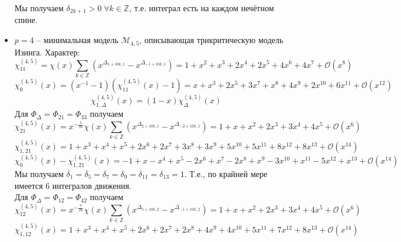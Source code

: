 \documentclass[12pt]{article}
\theoremstyle{definition}
\begin{document}
\begin{itemize}
\begin{equation}
    \end{equation}
    Мы получаем $\delta_{2k+1}>0\;\forall k\in\mathbb{Z}$, т.е. интеграл есть на каждом нечётном спине.
    \item $p=4$ -- минимальная модель $\mathcal{M}_{4,5}$, описывающая трикритическую модель Изинга. Характер:
    \begin{equation}
        \chi_{11}^{(4,5)}=\chi(x)\sum\limits_{k\in\mathbb{Z}}(x^{\Delta_{1+10k,1}}-x^{\Delta_{-1+10k,1}})=1+x^2+x^3+2x^4+2x^5+4x^6+4x^7+\mathcal{O}(x^8)
    \end{equation}
    \begin{equation}
        \chi^{(4,5)}_0(x)=(x^{-1}-1)(\chi^{(4,5)}_{11}(x)-1)=x+x^3+2x^5+3x^7+x^8+4x^9+2x^{10}+6x^{11}+\mathcal{O}(x^{12})
    \end{equation}
    \begin{equation}
        \chi^{(4,5)}_{1,\Delta}(x)=(1-x)\chi^{(4,5)}_\Delta(x)
    \end{equation}
    Для $\Phi_\Delta=\Phi_{21}=\Phi_{33}$ получаем
    \begin{equation}
        \chi^{(4,5)}_{21}(x)=x^{-\frac{1}{10}}\chi(x)\sum\limits_{k\in\mathbb{Z}}(x^{\Delta_{2+10k,1}}-x^{\Delta_{-2+10k,1}})=1+x+x^2+2x^3+3x^4+4x^5+\mathcal{O}(x^6)
    \end{equation}
    \begin{equation}
        \chi^{(4,5)}_{1,21}(x)=1+x^3+x^4+x^5+2x^6+2x^7+3x^8+3x^9+5x^{10}+5x^{11}+8x^{12}+8x^{13}+\mathcal{O}(x^{14})
    \end{equation}
    \begin{equation}
        \chi^{(4,5)}_0(x)-\chi^{(4,5)}_{1,21}(x)=-1+x-x^4+x^5-2x^6+x^7-2x^8+x^9-3x^{10}+x^{11}-5x^{12}+x^{13}+\mathcal{O}(x^{14})
    \end{equation}
    Мы получаем $\delta_1=\delta_5=\delta_7=\delta_9=\delta_{11}=\delta_{13}=1$. Т.е., по крайней мере имеется 6 интегралов движения.\\
    Для $\Phi_\Delta=\Phi_{12}=\Phi_{42}$ получаем
    \begin{equation}
        \chi^{(4,5)}_{12}(x)=x^{-\frac{7}{16}}\chi(x)\sum\limits_{k\in\mathbb{Z}}(x^{\Delta_{1+10k,2}}-x^{\Delta_{-1+10k,2}})=1+x+x^2+2x^3+3x^4+4x^5+\mathcal{O}(x^6)
    \end{equation}
    \begin{equation}
        \chi^{(4,5)}_{1,12}(x)=1+x^3+x^4+x^5+2x^6+2x^7+2x^8+4x^9+4x^{10}+5x^{11}+7x^{12}+8x^{13}+\mathcal{O}(x^{14})
    \end{equation}
    \begin{equation}

\end{equation}
\end{itemize}
\end{document}

